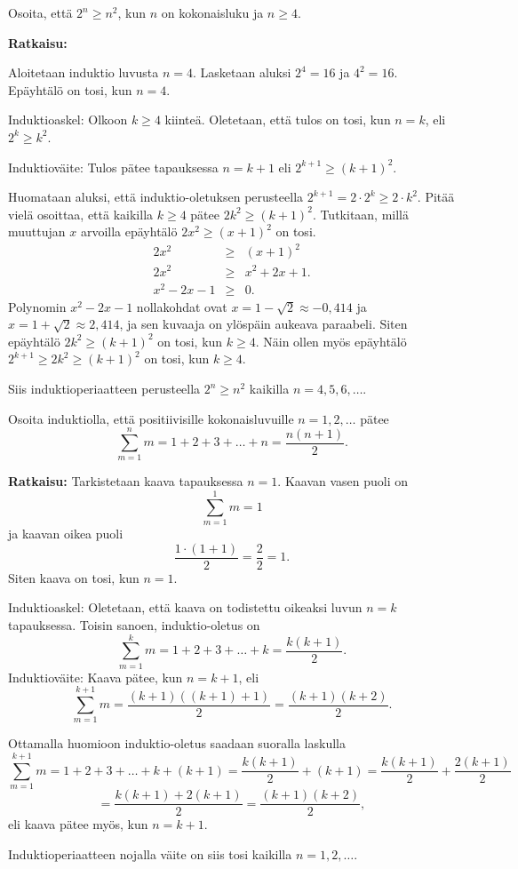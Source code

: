 \begin{esimerkki}
Osoita, että $2^n \ge n^2$, kun $n$ on kokonaisluku ja $n \ge 4$.

{\bf Ratkaisu:}

Aloitetaan induktio luvusta $n=4$. Lasketaan aluksi $2^4 = 16$ ja $4^2 = 16$. Epäyhtälö on tosi, kun $n=4$.

Induktioaskel: Olkoon $k\ge 4$ kiinteä. Oletetaan, että tulos on tosi, kun $n=k$, eli $2^k \ge k^2$.

Induktioväite: Tulos pätee tapauksessa $n=k+1$ eli $2^{k+1} \ge (k+1)^2$.

Huomataan aluksi, että induktio-oletuksen perusteella $2^{k+1} = 2 \cdot 2^k \ge 2 \cdot k^2$. Pitää vielä osoittaa, että kaikilla $k \ge 4$ pätee $2k^2 \ge (k + 1)^2$.
Tutkitaan, millä muuttujan $x$ arvoilla epäyhtälö $2x^2 \ge (x + 1)^2$ on tosi.
\begin{eqnarray*}
 2x^2 &\ge& (x + 1)^2\\
 2x^2 &\ge& x^2 + 2x + 1.\\ 
x^2 - 2x - 1 &\ge& 0.
\end{eqnarray*}
Polynomin $x^2 - 2x - 1$ nollakohdat ovat $x = 1 - \sqrt{2}\approx -0,414$ ja $x = 1 + \sqrt{2}\approx 2,414$, ja sen kuvaaja on ylöspäin aukeava paraabeli. Siten epäyhtälö $2k^2 \ge (k + 1)^2$ on tosi, kun $k \ge 4$. Näin ollen myös epäyhtälö $2^{k+1} \ge 2k^2 \ge (k + 1)^2$ on tosi, kun $k \ge 4$. 

Siis induktioperiaatteen perusteella $2^n \ge n^2$ kaikilla $n=4, 5, 6, \ldots$.
\end{esimerkki}


\begin{esimerkki}
Osoita induktiolla, että
positiivisille kokonaisluvuille $n=1, 2, \ldots$ pätee
\[
\sum_{m=1}^n m = 1+2+3+\ldots+n= \frac{n(n+1)}{2}.
\]

{\bf Ratkaisu:} Tarkistetaan kaava tapauksessa $n=1$.
Kaavan vasen puoli on
\[
\sum_{m=1}^1 m = 1
\]
ja kaavan oikea puoli
\[
\frac{1\cdot (1+1)}{2}= \frac{2}{2}=1.
\]
Siten kaava on tosi, kun $n=1$.

Induktioaskel: Oletetaan, että kaava on todistettu
oikeaksi luvun $n=k$ tapauksessa. Toisin sanoen,
induktio-oletus on
\[
\sum_{m=1}^k m = 1+2+3+ \ldots + k = \frac{k(k+1)}{2}.
\]
Induktioväite: Kaava pätee, kun $n=k+1$, eli
\[
\sum_{m=1}^{k+1} m = \frac{(k+1)((k+1)+1)}{2} =
\frac{(k+1)(k+2)}{2}.
\]

Ottamalla huomioon induktio-oletus saadaan suoralla
laskulla
\[
\sum_{m=1}^{k+1} m = 1+2+3+ \ldots + k + (k + 1)
= \frac{k(k+1)}{2} + (k+1) = \frac{k(k+1)}{2} +
\frac{2(k+1)}{2}
\]
\[
=\frac{k(k+1) + 2(k+1)}{2} = \frac{(k+1)(k+2)}{2},
\]
eli kaava pätee myös, kun $n=k+1$.

Induktioperiaatteen nojalla väite on siis tosi kaikilla
$n=1, 2, \ldots$.
\end{esimerkki}

